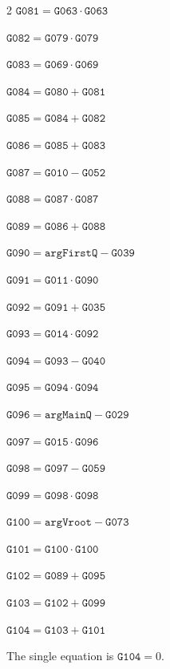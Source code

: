 \documentclass[10pt]{article}
\begin{document}
\begin{multicols}{2}
\noindent $\mathtt{G081}=\mathtt{G063}\cdot \mathtt{G063}$\par
\noindent $\mathtt{G082}=\mathtt{G079}\cdot \mathtt{G079}$\par
\noindent $\mathtt{G083}=\mathtt{G069}\cdot \mathtt{G069}$\par
\noindent $\mathtt{G084}=\mathtt{G080}+\mathtt{G081}$\par
\noindent $\mathtt{G085}=\mathtt{G084}+\mathtt{G082}$\par
\noindent $\mathtt{G086}=\mathtt{G085}+\mathtt{G083}$\par
\noindent $\mathtt{G087}=\mathtt{G010}-\mathtt{G052}$\par
\noindent $\mathtt{G088}=\mathtt{G087}\cdot \mathtt{G087}$\par
\noindent $\mathtt{G089}=\mathtt{G086}+\mathtt{G088}$\par
\noindent $\mathtt{G090}=\mathtt{argFirstQ}-\mathtt{G039}$\par
\noindent $\mathtt{G091}=\mathtt{G011}\cdot \mathtt{G090}$\par
\noindent $\mathtt{G092}=\mathtt{G091}+\mathtt{G035}$\par
\noindent $\mathtt{G093}=\mathtt{G014}\cdot \mathtt{G092}$\par
\noindent $\mathtt{G094}=\mathtt{G093}-\mathtt{G040}$\par
\noindent $\mathtt{G095}=\mathtt{G094}\cdot \mathtt{G094}$\par
\noindent $\mathtt{G096}=\mathtt{argMainQ}-\mathtt{G029}$\par
\noindent $\mathtt{G097}=\mathtt{G015}\cdot \mathtt{G096}$\par
\noindent $\mathtt{G098}=\mathtt{G097}-\mathtt{G059}$\par
\noindent $\mathtt{G099}=\mathtt{G098}\cdot \mathtt{G098}$\par
\noindent $\mathtt{G100}=\mathtt{argVroot}-\mathtt{G073}$\par
\noindent $\mathtt{G101}=\mathtt{G100}\cdot \mathtt{G100}$\par
\noindent $\mathtt{G102}=\mathtt{G089}+\mathtt{G095}$\par
\noindent $\mathtt{G103}=\mathtt{G102}+\mathtt{G099}$\par
\noindent $\mathtt{G104}=\mathtt{G103}+\mathtt{G101}$\par
\end{multicols}
\noindent The single equation is $\boxed{\mathtt{G104}=0}$.
\par\medskip
\end{document}
